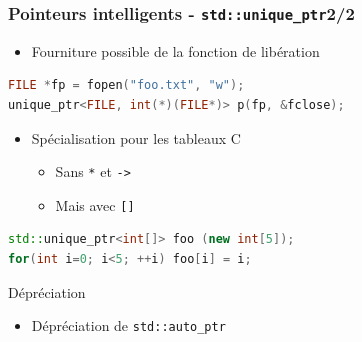 \documentclass[C++.tex]{subfiles}
\begin{document}
\begin{frame}[fragile]
	\frametitle{Pointeurs intelligents - \lstinline|std::unique_ptr|\titlehfill{}2/2}
	\begin{itemize}
		\item Fourniture possible de la fonction de libération
	\end{itemize}

	\begin{lstlisting}[language=C++]
FILE *fp = fopen("foo.txt", "w");
unique_ptr<FILE, int(*)(FILE*)> p(fp, &fclose);\end{lstlisting}


	\begin{itemize}
		\item Spécialisation pour les tableaux C
		\begin{itemize}
			\item Sans \lstinline|*| et \lstinline|->|
			\item Mais avec \lstinline|[]|
		\end{itemize}
	\end{itemize}

	\begin{lstlisting}[language=C++]
std::unique_ptr<int[]> foo (new int[5]);
for(int i=0; i<5; ++i) foo[i] = i;\end{lstlisting}

	\begin{block}{Dépréciation}
		\begin{itemize}
			\item Dépréciation de \lstinline|std::auto_ptr|
		\end{itemize}
	\end{block}
\end{frame}
\end{document}

